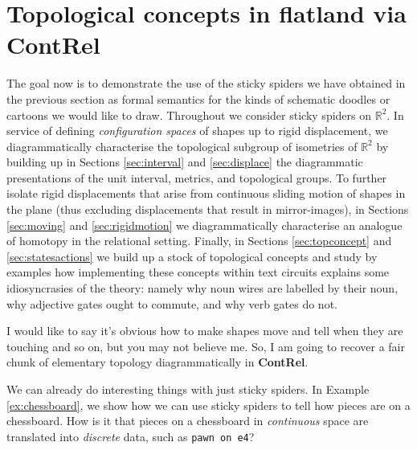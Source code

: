 \section{Topological concepts in flatland via \textbf{ContRel}}

The goal now is to demonstrate the use of the sticky spiders we have obtained in the previous section as formal semantics for the kinds of schematic doodles or cartoons we would like to draw. Throughout we consider sticky spiders on $\mathbb{R}^2$. In service of defining \emph{configuration spaces} of shapes up to rigid displacement, we diagrammatically characterise the topological subgroup of isometries of $\mathbb{R}^2$ by building up in Sections \ref{sec:interval} and \ref{sec:displace} the diagrammatic presentations of the unit interval, metrics, and topological groups. To further isolate rigid displacements that arise from continuous sliding motion of shapes in the plane (thus excluding displacements that result in mirror-images), in Sections \ref{sec:moving} and \ref{sec:rigidmotion} we diagrammatically characterise an analogue of homotopy in the relational setting. Finally, in Sections \ref{sec:topconcept} and \ref{sec:statesactions} we build up a stock of topological concepts and study by examples how implementing these concepts within text circuits explains some idiosyncrasies of the theory: namely why noun wires are labelled by their noun, why adjective gates ought to commute, and why verb gates do not.

 I would like to say it's obvious how to make shapes move and tell when they are touching and so on, but you may not believe me. So, I am going to recover a fair chunk of elementary topology diagrammatically in \textbf{ContRel}.

 We can already do interesting things with just sticky spiders. In Example \ref{ex:chessboard}, we show how we can use sticky spiders to tell how pieces are on a chessboard. How is it that pieces on a chessboard in \emph{continuous} space are translated into \emph{discrete} data, such as \texttt{pawn on e4}?

